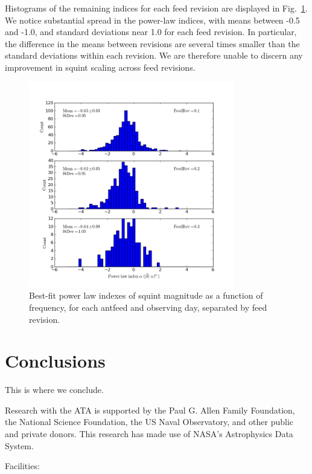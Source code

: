 \documentclass[preprint]{aastex}
\begin{document}
Histograms of the remaining indices for each feed revision are displayed in 
Fig.~\ref{fig.powerlaws}.  We notice substantial spread in the power-law 
indices, with means between -0.5 and -1.0, and standard deviations near 
1.0 for each feed revision.  In particular, the difference in the means 
between revisions are several times smaller than the standard deviations 
within each revision. We are therefore unable to discern any improvement in 
squint scaling across feed revisions.

\begin{figure}[htb]
\begin{center}
\includegraphics[width=0.8\textwidth]{images/powerlaw_rev}
\caption{Best-fit power law indexes of squint magnitude as a function of frequency, for each antfeed and observing day, separated by feed revision. \label{fig.powerlaws}}
\end{center}
\end{figure}

\section{Conclusions}\label{s.conclusions}
This is where we conclude.


\acknowledgments
Research with the ATA is supported by the Paul G. Allen Family
Foundation, the National Science Foundation, the US Naval Observatory,
and other public and private donors. This research has made use of
NASA's Astrophysics Data System.

Facilities: 



\end{document}
